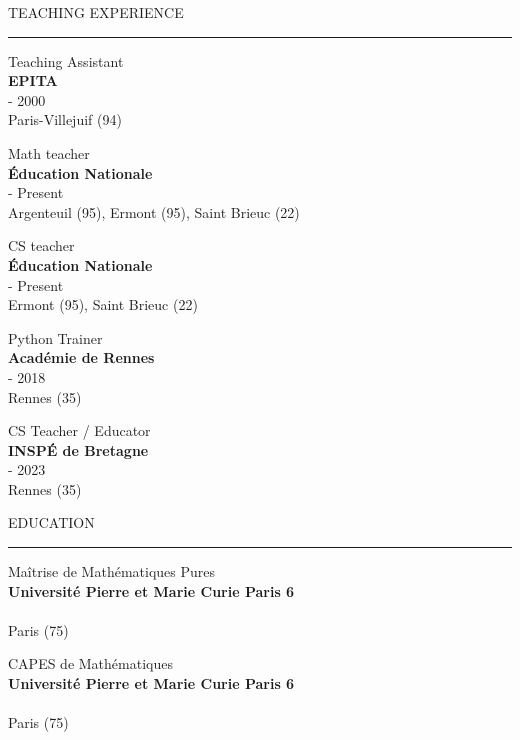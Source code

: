 \documentclass[12pt,a4paper,article,english,firamath]{nsi}
\begin{document}
\begin{multicols}{2}
{\color{UGLiBlue}\large\titlefont TEACHING EXPERIENCE\\[-1em]\hrule}

\bigskip Teaching Assistant \\
{\color{UGLiBlue}\textbf{EPITA }}\\
{\color{lightgray} - 2000\\ \faMapMarker* Paris-Villejuif (94)}

\bigskip Math teacher \\
{\color{UGLiBlue}\textbf{Éducation Nationale}}\\
{\color{lightgray} - Present\\ \faMapMarker*\small Argenteuil (95), Ermont (95), Saint Brieuc (22)}

\bigskip CS teacher \\
{\color{UGLiBlue}\textbf{Éducation Nationale}}\\
{\color{lightgray} - Present\\ \faMapMarker* Ermont (95), Saint Brieuc (22)}

\bigskip Python Trainer \\
{\color{UGLiBlue}\textbf{Académie de Rennes}}\\
{\color{lightgray} - 2018\\ \faMapMarker* Rennes (35)}

\bigskip CS Teacher / Educator \\
{\color{UGLiBlue}\textbf{INSPÉ de Bretagne}}\\
{\color{lightgray} - 2023\\ \faMapMarker* Rennes (35)}



\columnbreak
{\color{UGLiBlue}\large\titlefont EDUCATION\\[-1em]\hrule}


\bigskip Maîtrise de Mathématiques Pures \\
{\color{UGLiBlue}\textbf{Université Pierre et Marie Curie Paris 6}}\\
{\color{lightgray}\\ \faMapMarker* Paris (75)}

\bigskip CAPES de Mathématiques \\
{\color{UGLiBlue}\textbf{Université Pierre et Marie Curie Paris 6}}\\
{\color{lightgray}\\ \faMapMarker* Paris (75)}


\end{multicols}
\end{document}
